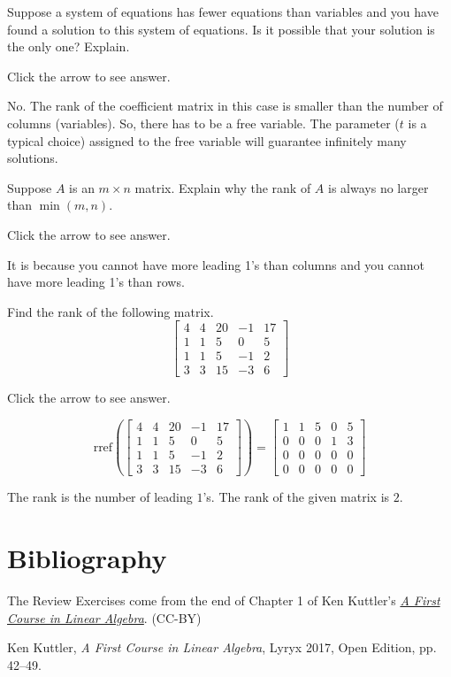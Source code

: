 \documentclass{ximera}
\begin{document}
\begin{problem}\label{prb:2.39} Suppose a system of equations has fewer equations than variables and
you have found a solution to this system of equations. Is it possible that
your solution is the only one? Explain.

Click the arrow to see answer. 
\begin{expandable}
No. The rank of the coefficient matrix in this case is smaller than the number of columns (variables).  So, there has to be a free variable.  The parameter ($t$ is a typical choice) assigned to the free variable will guarantee infinitely many solutions.
\end{expandable}
\end{problem}

\begin{problem}\label{prb:2.55} Suppose $A$ is an $m\times n$ matrix. Explain why the rank of $A$ is
always no larger than $\min \left( m,n\right).$

Click the arrow to see answer. 
\begin{expandable}
It is because you cannot
have more leading 1's than columns and you cannot have more leading 1's than rows.
\end{expandable}
\end{problem}

\begin{problem}\label{prb:2.53} Find the rank of the following matrix.
$$\begin{bmatrix}
4 & 4 & 20 & -1 & 17 \\
1 & 1 & 5 & 0 & 5 \\
1 & 1 & 5 & -1 & 2 \\
3 & 3 & 15 & -3 & 6
\end{bmatrix}$$

Click the arrow to see answer. 
\begin{expandable}
$$\text{rref}\left(\begin{bmatrix}4 & 4 & 20 & -1 & 17 \\
1 & 1 & 5 & 0 & 5 \\
1 & 1 & 5 & -1 & 2 \\
3 & 3 & 15 & -3 & 6\end{bmatrix}\right)=\begin{bmatrix}1 &1 &5 &0 &5\\
 0 & 0 &0 &1 &3\\
 0 &0 &0 &0 &0\\
 0& 0& 0& 0& 0\end{bmatrix}$$

 The rank is the number of leading $1$'s.  The rank of the given matrix is $2$.
\end{expandable}
\end{problem}

\section*{Bibliography}
The Review Exercises come from the end of Chapter 1 of Ken Kuttler's \href{https://open.umn.edu/opentextbooks/textbooks/a-first-course-in-linear-algebra-2017}{\it A First Course in Linear Algebra}. (CC-BY)

Ken Kuttler, {\it  A First Course in Linear Algebra}, Lyryx 2017, Open Edition, pp. 42--49. 
\end{document}
